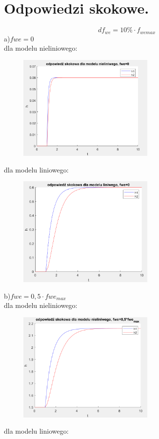 \documentclass{article}
\begin{document}
\section{Odpowiedzi skokowe.}
 $$df_{we}=10\% \cdot f_{we max}$$
 a)$fwe=0$\\
 dla modelu nieliniowego:
 \begin{figure}[h!]
    \centering
    \includegraphics[width=0.6\textwidth]{skokNL0.png}
    \label{fig:my_label}
\end{figure}
\newpage
dla modelu liniowego:
\begin{figure}[h!]
    \centering
    \includegraphics[width=0.6\textwidth]{skokL0.png}
    \label{fig:my_label}
\end{figure}
\begin{flushleft}
b)$fwe=0,5\cdot fwe_{max}$\\
 dla modelu nieliniowego:
\end{flushleft}
 
 \begin{figure}[h!]
    \centering
    \includegraphics[width=0.6\textwidth]{skokNL05.png}
    \label{fig:my_label}
\end{figure}
\newpage
\begin{flushleft}
dla modelu liniowego:
\end{flushleft}
\end{document}
